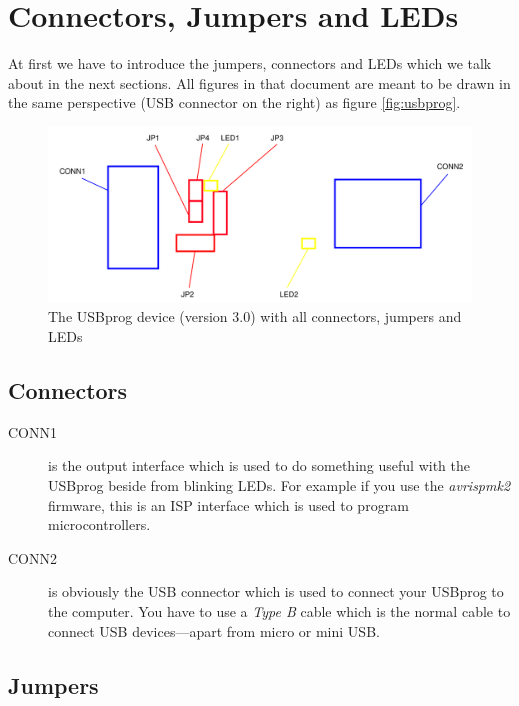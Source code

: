 \documentclass[bibtotoc,UKenglish,halfparskip,oneside,DIV12]{scrreprt}
\begin{document}
\section{Connectors, Jumpers and LEDs}

At first we have to introduce the jumpers, connectors and LEDs which we talk about in the next
sections. All figures in that document are meant to be drawn in the same perspective (USB connector
on the right) as figure \vref{fig:usbprog}.

\begin{figure}[ht]
  \centering
  \includegraphics{images/usbprog_components}
  \caption{The USBprog device (version 3.0) with all connectors, jumpers and LEDs}
  \label{fig:usbprog}
\end{figure}

\subsection{Connectors}
\label{sec:connectors}

\begin{description}
  \item[CONN1] is the output interface which is used to do something useful with the USBprog beside
    from blinking LEDs. For example if you use the \emph{avrispmk2} firmware, this is an ISP
    interface which is used to program microcontrollers.

  \item[CONN2] is obviously the USB connector which is used to connect your USBprog to the computer.
    You have to use a \emph{Type B} cable which is the normal cable to connect USB devices---apart
    from micro or mini USB.
\end{description}


\subsection{Jumpers}
\label{sec:jumpers}
\end{document}

